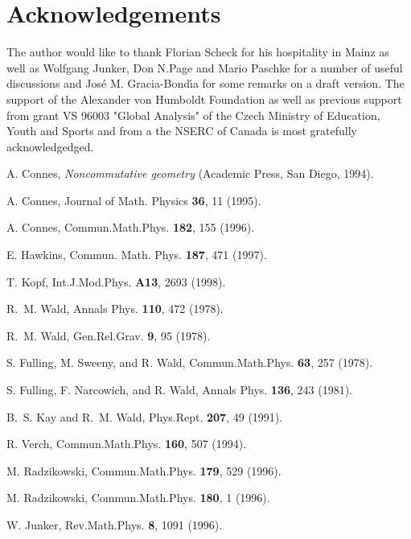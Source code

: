 \documentclass[a4paper,10pt,oneside]{amsart}
\theoremstyle{plain}
\theoremstyle{definition}
\theoremstyle{remark}
\begin{document}
\section{Acknowledgements}
The author would like to thank Florian Scheck for his hospitality
in Mainz as well as Wolfgang Junker, Don N.Page and Mario Paschke
for a number of useful discussions and Jos\'e M. Gracia-Bond\'{\i}a for
some remarks on a draft version. The support of the Alexander von
Humboldt Foundation as well as previous support from grant VS
96003 "Global Analysis" of the Czech Ministry of Education, Youth
and Sports and from a the NSERC of Canada is most gratefully
acknowledgedged.






\begin{thebibliography}{10}

A. Connes, {\em Noncommutative geometry} (Academic Press, San
Diego, 1994).

A. Connes, Journal of Math. Physics {\bf 36},  11  (1995).

A. Connes, Commun.Math.Phys. {\bf 182},  155  (1996).

E. Hawkins, Commun. Math. Phys. {\bf 187},  471  (1997).

T. Kopf, Int.J.Mod.Phys. {\bf A13},  2693  (1998).

R.~M. Wald, Annals Phys. {\bf 110},  472  (1978).

R.~M. Wald, Gen.Rel.Grav. {\bf 9},  95  (1978).

S. Fulling, M. Sweeny, and R. Wald, Commun.Math.Phys. {\bf 63},
257  (1978).

S. Fulling, F. Narcowich, and R. Wald, Annals Phys. {\bf 136},
243  (1981).

B.~S. Kay and R.~M. Wald, Phys.Rept. {\bf 207},  49  (1991).

R. Verch, Commun.Math.Phys. {\bf 160},  507  (1994).

M. Radzikowski, Commun.Math.Phys. {\bf 179},  529  (1996).

M. Radzikowski, Commun.Math.Phys. {\bf 180},  1  (1996).

W. Junker, Rev.Math.Phys. {\bf 8},  1091  (1996).


\end{thebibliography}
\end{document}
